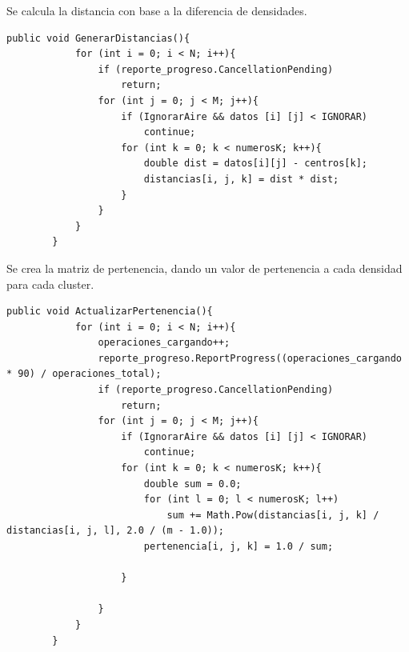 \documentclass[12pt]{report}
\begin{document}
\vspace*{1cm}
Se calcula la distancia con base a la diferencia de densidades.
\lstset{language=C, breaklines=true, basicstyle=\footnotesize}
\lstset{numbers=left, numberstyle=\tiny, stepnumber=1, numbersep=-2pt}
\begin{lstlisting}[frame=single]
	public void GenerarDistancias(){
            for (int i = 0; i < N; i++){
                if (reporte_progreso.CancellationPending)
                    return;
                for (int j = 0; j < M; j++){
                    if (IgnorarAire && datos [i] [j] < IGNORAR)
                        continue;
                    for (int k = 0; k < numerosK; k++){
                        double dist = datos[i][j] - centros[k];
                        distancias[i, j, k] = dist * dist;
                    }
                }
            }
        }
\end{lstlisting}

\newpage
\vspace*{3cm}
Se crea la matriz de pertenencia, dando un valor de pertenencia a cada densidad para cada cluster.
\lstset{language=C, breaklines=true, basicstyle=\footnotesize}
\lstset{numbers=left, numberstyle=\tiny, stepnumber=1, numbersep=-2pt}
\begin{lstlisting}[frame=single]
	public void ActualizarPertenencia(){
            for (int i = 0; i < N; i++){
                operaciones_cargando++;
                reporte_progreso.ReportProgress((operaciones_cargando * 90) / operaciones_total);
                if (reporte_progreso.CancellationPending)
                    return;
                for (int j = 0; j < M; j++){
                    if (IgnorarAire && datos [i] [j] < IGNORAR)
                        continue;
                    for (int k = 0; k < numerosK; k++){
                        double sum = 0.0;
                        for (int l = 0; l < numerosK; l++)
                            sum += Math.Pow(distancias[i, j, k] / distancias[i, j, l], 2.0 / (m - 1.0));  
                        pertenencia[i, j, k] = 1.0 / sum;
                            
                    }
                    
                }
            }
        }
\end{lstlisting}
\end{document}
